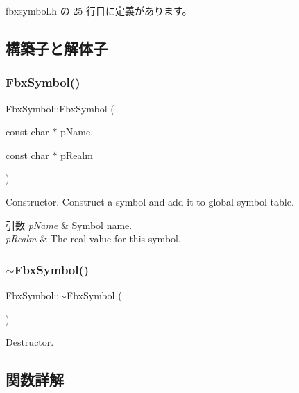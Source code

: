  fbxsymbol.\+h の 25 行目に定義があります。



\subsection{構築子と解体子}
\mbox{\label{class_fbx_symbol_ac9c03734e434a83ec3ef918864cd3e85}} 
\subsubsection{\texorpdfstring{Fbx\+Symbol()}{FbxSymbol()}}
{\footnotesize\ttfamily Fbx\+Symbol\+::\+Fbx\+Symbol (\begin{DoxyParamCaption}\item[{const char $\ast$}]{p\+Name,  }\item[{const char $\ast$}]{p\+Realm }\end{DoxyParamCaption})}

Constructor. Construct a symbol and add it to global symbol table. 
\begin{DoxyParams}{引数}
{\em p\+Name} & Symbol name. \\
\hline
{\em p\+Realm} & The real value for this symbol. \\
\hline
\end{DoxyParams}
\mbox{\label{class_fbx_symbol_a50d2302a5d037c49c5f0744a87acdf5f}} 
\subsubsection{\texorpdfstring{$\sim$\+Fbx\+Symbol()}{~FbxSymbol()}}
{\footnotesize\ttfamily Fbx\+Symbol\+::$\sim$\+Fbx\+Symbol (\begin{DoxyParamCaption}{ }\end{DoxyParamCaption})}



Destructor. 



\subsection{関数詳解}
\mbox{\label{class_fbx_symbol_ad09b7aceadb22213dad8208edaf9cce4}} 
